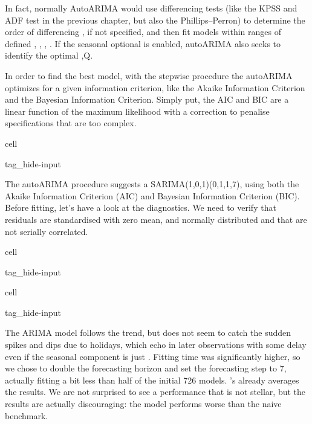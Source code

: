 \documentclass[letterpaper,10pt,english]{jupyterBook}
\begin{document}
\sphinxAtStartPar
In fact, normally Auto\sphinxhyphen{}ARIMA would use differencing tests (like the KPSS and ADF test in the previous chapter, but also the Phillips–Perron) to determine the order of differencing , if not specified, and then fit models within ranges of defined , , , . If the seasonal optional is enabled, auto\sphinxhyphen{}ARIMA also seeks to identify the optimal ,Q.

\sphinxAtStartPar
In order to find the best model, with the stepwise procedure the auto\sphinxhyphen{}ARIMA optimizes for a given information criterion, like the Akaike Information Criterion and the Bayesian Information Criterion. Simply put, the AIC and BIC are a linear function of the maximum likelihood with a correction to penalise specifications that are too complex.

\begin{sphinxuseclass}{cell}
\begin{sphinxuseclass}{tag_hide-input}
\end{sphinxuseclass}
\end{sphinxuseclass}
\sphinxAtStartPar
The auto\sphinxhyphen{}ARIMA procedure suggests a SARIMA(1,0,1)(0,1,1,7), using both the Akaike Information Criterion (AIC) and Bayesian Information Criterion (BIC). Before fitting, let’s have a look at the diagnostics. We need to verify that residuals are standardised with zero mean, and normally distributed and that are not serially correlated.

\begin{sphinxuseclass}{cell}
\begin{sphinxuseclass}{tag_hide-input}
\end{sphinxuseclass}
\end{sphinxuseclass}
\begin{sphinxuseclass}{cell}
\begin{sphinxuseclass}{tag_hide-input}
\end{sphinxuseclass}
\end{sphinxuseclass}
\sphinxAtStartPar
The ARIMA model follows the trend, but does not seem to catch the sudden spikes and dips due to holidays, which echo in later observations with some delay \sphinxhyphen{} even if the seasonal component is just . Fitting time was significantly higher, so we chose to double the forecasting horizon and set the forecasting step to 7, actually fitting a bit less than half of the initial 726 models. ’s  already averages the results. We are not surprised to see a performance that is not stellar, but the results are actually discouraging: the model performs worse than the naive benchmark.
\end{document}

